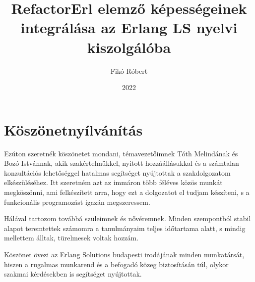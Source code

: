 \documentclass[
	final, %
]{elteikthesis}[2021/09/20]
\title{RefactorErl elemző képességeinek integrálása az Erlang LS nyelvi
kiszolgálóba} %
\date{2022} %
\author{Fikó Róbert}
\affiliation{Egyetemi docens, Egyetemi adjunktus} %
\begin{document}

\listoftodos[\todolabel]


\maketitle



\tableofcontents
\cleardoublepage

\chapter*{Köszönetnyílvánítás}
\thispagestyle{empty}

Ezúton szeretnék köszönetet mondani, témavezetőimnek Tóth Melindának és Bozó Istvánnak, akik szakértelmükkel, nyitott hozzáállásukkal és a számtalan konzultációs lehetőséggel hatalmas segítséget nyújtottak a szakdolgozatom elkészüléséhez. Itt szeretném azt az immáron több féléves közös munkát megköszönni, ami felkészített arra, hogy ezt a dolgozatot el tudjam készíteni, s a funkcionális programozást igazán megszeressem.

Hálával tartozom továbbá szüleimnek és nővéremnek. Minden szempontból stabil alapot teremtettek számomra a tanulmányaim teljes időtartama alatt, s mindig mellettem álltak, türelmesek voltak hozzám.

Köszönet övezi az Erlang Solutions budapesti irodájának minden munkatársát, hiszen a rugalmas munkarend és a befogadó közeg biztosításán túl, olykor szakmai kérdésekben is segítséget nyújtottak. 

\clearpage


\cleardoublepage


\cleardoublepage


\cleardoublepage


\cleardoublepage



{}
\printbibliography[title=\biblabel]
\cleardoublepage

{}
\listoffigures
\cleardoublepage



{}
\lstlistoflistings
\cleardoublepage

\end{document}
